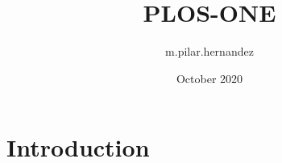 \documentclass{article}
\title{PLOS-ONE}
\author{m.pilar.hernandez }
\date{October 2020}
\begin{document}
\maketitle

\section{Introduction}
\end{document}
